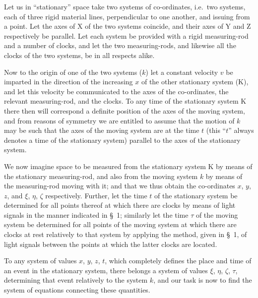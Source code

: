 \documentclass{article}
\begin{document}

Let us in ``stationary'' space take two systems of co-ordinates,
i.e.\ two systems, each of three rigid material lines,
perpendicular to one another, and issuing from a point.  Let the
axes of X of the two systems coincide, and their axes of Y and Z
respectively be parallel.  Let each system be provided with a
rigid measuring-rod and a number of clocks, and let the two
measuring-rods, and likewise all the clocks of the two systems,
be in all respects alike.

Now to the origin of one of the two systems ($k$) let a constant
velocity $v$ be imparted in the direction of the increasing $x$ of the
other stationary system (K), and let this velocity be communicated to
the axes of the co-ordinates, the relevant measuring-rod, and the
clocks.  To any time of the stationary system K there then will
correspond a definite position of the axes of the moving system, and
from reasons of symmetry we are entitled to assume that the motion of
$k$ may be such that the axes of the moving system are at the time
$t$
(this ``$t$'' always denotes a time of the stationary system) parallel to
the axes of the stationary system.

We now imagine space to be measured from the stationary system K by
means of the stationary measuring-rod, and also from the moving system
$k$ by means of the measuring-rod moving with it; and that we thus
obtain the co-ordinates $x$, $y$, $z$, and
$\xi$, $\eta$, $\zeta$ respectively.  Further, let the
time $t$ of the stationary system be determined for all points thereof
at which there are clocks by means of light signals in the manner
indicated in \S\ 1; similarly let the time $\tau$ of the moving system be
determined for all points of the moving system at which there are
clocks at rest relatively to that system by applying the method, given
in \S\ 1, of light signals between the points at which the latter clocks
are located.

To any system of values $x$, $y$, $z$, $t$, which completely defines the place
and time of an event in the stationary system, there belongs a system
of values
$\xi$, $\eta$, $\zeta$, $\tau$,
determining that event relatively to the system $k$,
and our task is now to find the system of equations connecting these
quantities.
\end{document}

